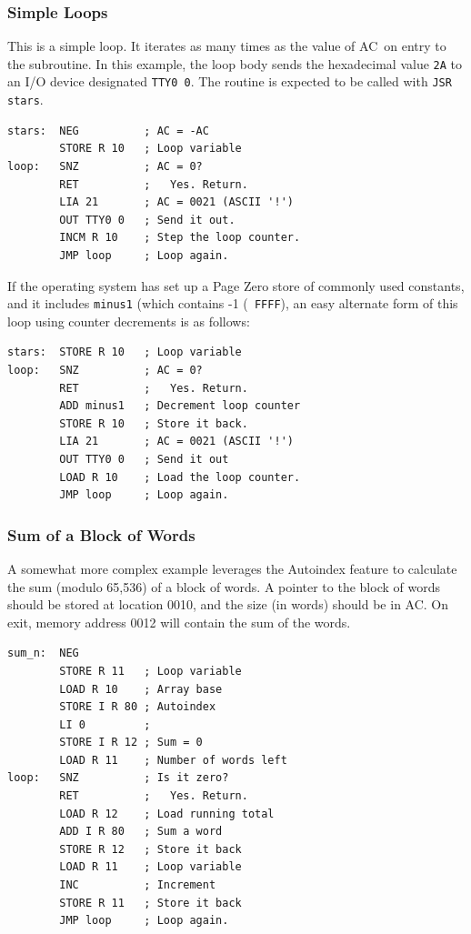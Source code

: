\documentclass[11pt,a4paper,twocolumns]{article}
\newcommand\hex[1]{\textsf{#1}}
\newcommand\register[1]{\textsf{#1}}
\newcommand\A{\register{AC}}
\begin{document}
\subsubsection{Simple Loops}

This is a simple loop. It iterates as many times as the value of
\A\ on entry to the subroutine. In this example, the loop body sends
the hexadecimal value {\tt 2A} to an I/O device designated {\tt TTY0
  0}. The routine is expected to be called with {\tt JSR stars}.

\begin{verbatim}
stars:  NEG          ; AC = -AC
        STORE R 10   ; Loop variable
loop:   SNZ          ; AC = 0?
        RET          ;   Yes. Return.
        LIA 21       ; AC = 0021 (ASCII '!')
        OUT TTY0 0   ; Send it out.
        INCM R 10    ; Step the loop counter.
        JMP loop     ; Loop again.
\end{verbatim}

If the operating system has set up a Page Zero store of commonly used
constants, and it includes {\tt minus1} (which contains -1 ({\tt
  FFFF}), an easy alternate form of this loop using counter decrements
is as follows:

\begin{verbatim}
stars:  STORE R 10   ; Loop variable
loop:   SNZ          ; AC = 0?
        RET          ;   Yes. Return.
        ADD minus1   ; Decrement loop counter
        STORE R 10   ; Store it back.
        LIA 21       ; AC = 0021 (ASCII '!')
        OUT TTY0 0   ; Send it out
        LOAD R 10    ; Load the loop counter.
        JMP loop     ; Loop again.
\end{verbatim}

\subsubsection{Sum of a Block of Words}

A somewhat more complex example leverages the Autoindex feature to
calculate the sum (modulo 65,536) of a block of words. A pointer to
the block of words should be stored at location \hex{0010}, and the
size (in words) should be in \A. On exit, memory address \hex{0012}
will contain the sum of the words.

\begin{verbatim}
sum_n:  NEG
        STORE R 11   ; Loop variable
        LOAD R 10    ; Array base
        STORE I R 80 ; Autoindex
        LI 0         ; 
        STORE I R 12 ; Sum = 0
        LOAD R 11    ; Number of words left
loop:   SNZ          ; Is it zero?
        RET          ;   Yes. Return.
        LOAD R 12    ; Load running total
        ADD I R 80   ; Sum a word
        STORE R 12   ; Store it back
        LOAD R 11    ; Loop variable
        INC          ; Increment
        STORE R 11   ; Store it back
        JMP loop     ; Loop again.
\end{verbatim}
\end{document}
